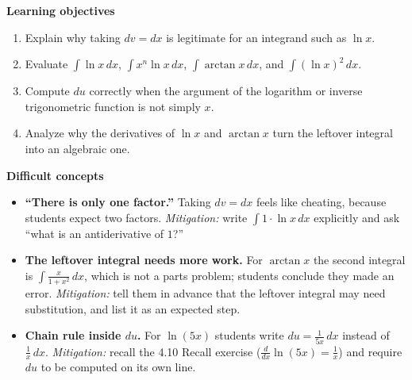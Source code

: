 \documentclass[11pt]{article}
\begin{document}
\textbf{Learning objectives}
\begin{enumerate}
\item Explain why taking $dv=dx$ is legitimate for an integrand such as $\ln x$.
\item Evaluate $\int\ln x\,dx$, $\int x^n\ln x\,dx$, $\int\arctan x\,dx$, and $\int(\ln x)^2\,dx$.
\item Compute $du$ correctly when the argument of the logarithm or inverse trigonometric function is not simply $x$.
\item Analyze why the derivatives of $\ln x$ and $\arctan x$ turn the leftover integral into an algebraic one.
\end{enumerate}

\textbf{Difficult concepts}
\begin{itemize}
\item \textbf{``There is only one factor.''} Taking $dv=dx$ feels like cheating, because students expect two factors. \emph{Mitigation:} write $\int 1\cdot\ln x\,dx$ explicitly and ask ``what is an antiderivative of $1$?''
\item \textbf{The leftover integral needs more work.} For $\arctan x$ the second integral is $\int\frac{x}{1+x^2}\,dx$, which is not a parts problem; students conclude they made an error. \emph{Mitigation:} tell them in advance that the leftover integral may need substitution, and list it as an expected step.
\item \textbf{Chain rule inside $du$.} For $\ln(5x)$ students write $du=\frac{1}{5x}\,dx$ instead of $\frac1x\,dx$. \emph{Mitigation:} recall the 4.10 Recall exercise ($\frac{d}{dx}\ln(5x)=\frac1x$) and require $du$ to be computed on its own line.
\end{itemize}
\end{document}

